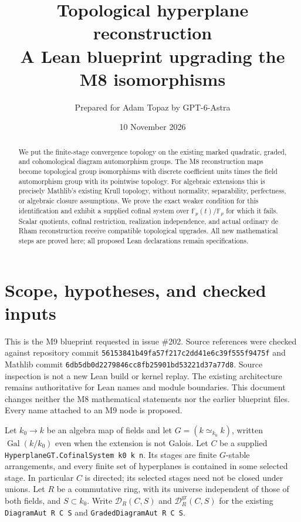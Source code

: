 \documentclass[11pt]{article}
\title{Topological hyperplane reconstruction\\
\large A Lean blueprint upgrading the M8 isomorphisms}
\author{Prepared for Adam Topaz by GPT-6-Astra}
\date{10 November 2026}
\theoremstyle{remark}\newtheorem{remark}[theorem]{Remark}
\newcommand{\F}{\mathbb F}
\newcommand{\Gal}{\operatorname{Gal}}
\newcommand{\D}{\mathcal D}
\newcommand{\DG}{\mathcal D^{\mathrm{gr}}}
\newcommand{\code}[1]{{\normalfont\nolinkurl{#1}}}
\begin{document}
\maketitle
\begin{abstract}
We put the finite-stage convergence topology on the existing marked
quadratic, graded, and cohomological diagram automorphism groups. The
M8 reconstruction maps become topological group isomorphisms with
discrete coefficient units times the field automorphism group with its
pointwise topology. For algebraic extensions this is precisely Mathlib's
existing Krull topology, without normality, separability, perfectness,
or algebraic closure assumptions. We prove the exact weaker condition
for this identification and exhibit a supplied cofinal system over
$\F_p(t)/\F_p$ for which it fails. Scalar quotients, cofinal restriction,
realization independence, and actual ordinary de Rham reconstruction
receive compatible topological upgrades. All new mathematical steps
are proved here; all proposed Lean declarations remain specifications.
\end{abstract}
\tableofcontents
\newpage

\section{Scope, hypotheses, and checked inputs}
\label{sec:scope}

This is the M9 blueprint requested in issue \#202. Source references were
checked against repository commit
\code{56153841b49fa57f217c2dd41e6c39f555f9475f} and Mathlib commit
\code{6db5db0d2279846cc8fb25901bd53221d37a77d8}.
Source inspection is not a new Lean build or kernel replay. The existing
architecture remains authoritative for Lean names and module boundaries.
This document changes neither the M8 mathematical statements nor the
earlier blueprint files. Every name attached to an M9 node is proposed.

Let $k_0\to k$ be an algebra map of fields and let
$G=(k\simeq_{k_0}k)$, written $\Gal(k/k_0)$ even when the extension is
not Galois. Let $C$ be a supplied
\texttt{HyperplaneGT.CofinalSystem k0 k n}. Its stages are finite
$G$-stable arrangements, and every finite set of hyperplanes is contained
in some selected stage. In particular $C$ is directed; its selected
stages need not be closed under unions. Let $R$ be a commutative ring,
with its universe independent of those of both fields, and $S\subset k_0$.
Write $\D_R(C,S)$ and $\DG_R(C,S)$ for the existing
\texttt{DiagramAut R C S} and \texttt{GradedDiagramAut R C S}.
\end{document}
